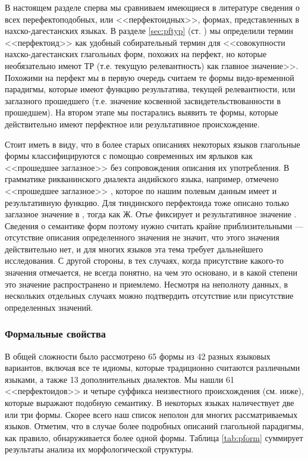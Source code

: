 \par В настоящем разделе сперва мы сравниваем имеющиеся в литературе сведения о всех перефектоподобных, или <<перфектоидных>>, формах, представленных в нахско-дагестанских языках. В разделе \ref{sec:pftyp} (ст. \pageref{perfectoidpage}) мы определили термин <<перфектоид>> как удобный собирательный термин для <<совокупности нахско-дагестанских глагольных форм, похожих на перфект, но которые необязательно имеют ТР (т.е. текущую релевантность) как главное значение>>. Похожими на перфект мы в первую очередь считаем те формы видо-временной парадигмы, которые имеют функцию результатива, текущей релевантности, или заглазного прошедшего (т.е. значение косвенной засвидетельствованности в прошедшем). На втором этапе мы постарались выявить те формы, которые действительно имеют перфектное или результативное происхождение. 
\par Стоит иметь в виду, что в более старых описаниях некоторых языков глагольные формы классифицируются с помощью современных им ярлыков как <<прошедшее заглазное>> без сопровождения описания их употребления. В грамматике рикванинского диалекта андийского языка, например, отмечено <<прошедшее заглазное>> \citep{sulejmanov1957}, которое по нашим полевым данным имеет и результативную функцию. Для тиндинского перфектоида тоже описано только заглазное значение в \citep{magomedova2012}, тогда как Ж. Отье фиксирует и результативное значение \citep{authiertindi}. Сведения о семантике форм поэтому нужно считать крайне приблизительными --- отсутствие описания определенного значения не значит, что этого значения действительно нет, и для многих языков эта тема требует дальнейшего исследования. С другой стороны, в тех случаях, когда присутствие какого-то значения отмечается, не всегда понятно, на чем это основано, и в какой степени это значение распространено и приемлемо. Несмотря на неполноту данных, в нескольких отдельных случаях можно подтвердить отсутствие или присутствие определенных значений.

\subsubsection{Формальные свойства} \label{sec:pfform}

В общей сложности было рассмотрено 65 формы из 42 разных языковых вариантов, включая все те идиомы, которые традиционно считаются различными языками, а также 13 дополнительных диалектов. Мы нашли 61 <<перфектоидов>> и четыре суффикса неизвестного происхождения (см. ниже), которые выражают подобную семантику. В некоторых языках наличествует две или три формы. Скорее всего наш список неполон для многих рассматриваемых языков. Отметим, что в случае более подробных описаний глагольной парадигмы, как правило, обнаруживается более одной формы. Таблица \ref{tab:pform} суммирует результаты анализа их морфологической структуры. 


